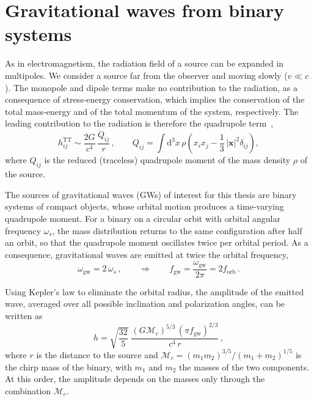 \section{Gravitational waves from binary systems} \label{sec:GW_binarie}

As in electromagnetism, the radiation field of a source can be expanded in
multipoles. We consider a source far from the observer and moving slowly
($v \ll c$). The monopole and dipole terms make no contribution to the radiation, as a
consequence of stress-energy conservation, which implies the conservation of
the total mass-energy and of the total momentum of the system, respectively. The leading contribution to the
radiation is therefore the quadrupole term~\cite{Maggiore2008},
\begin{equation}
    h_{ij}^{\mathrm{TT}} \sim \frac{2G}{c^4}\,\frac{\ddot{Q}_{ij}}{r}\, ,
    \qquad
    Q_{ij} = \int \mathrm{d}^3x\, \rho \left( x_i x_j - \frac{1}{3}\, |\mathbf{x}|^2 \delta_{ij} \right) ,
    \label{eq:quadrupolo}
\end{equation}
where $Q_{ij}$ is the reduced (traceless) quadrupole moment of the mass density
$\rho$ of the source.

The sources of gravitational waves (GWs) of interest for this thesis are
binary systems of compact objects, whose orbital motion produces a time-varying quadrupole moment.
For a binary on a circular orbit with orbital angular frequency
$\omega_s$, the mass distribution returns to the same configuration after half
an orbit, so that the quadrupole moment oscillates twice per orbital period.
As a consequence, gravitational waves are emitted at twice the orbital
frequency,
\begin{equation}
    \omega_{\mathrm{gw}} = 2\,\omega_s\, , \qquad \Rightarrow \qquad
    f_{\mathrm{gw}} = \frac{\omega_{\mathrm{gw}}}{2\pi} = 2 f_{\mathrm{orb}}\, .
    \label{eq:fgw}
\end{equation}

Using Kepler's law to eliminate the orbital radius, the amplitude of the
emitted wave, averaged over all possible inclination and polarization angles,
can be written as~\cite{Taylor2021}
\begin{equation}
    h = \sqrt{\frac{32}{5}}\;
    \frac{(G\mathcal{M}_c)^{5/3}\,(\pi f_{\mathrm{gw}})^{2/3}}{c^4\, r}\, ,
    \label{eq:ampiezza_binaria}
\end{equation}
where $r$ is the distance to the source and
$\mathcal{M}_c = (m_1 m_2)^{3/5}/(m_1 + m_2)^{1/5}$ is the chirp mass of the binary, with $m_1$ and $m_2$ the masses of the two
components. At this order, the amplitude depends on the masses only through
the combination $\mathcal{M}_c$.

